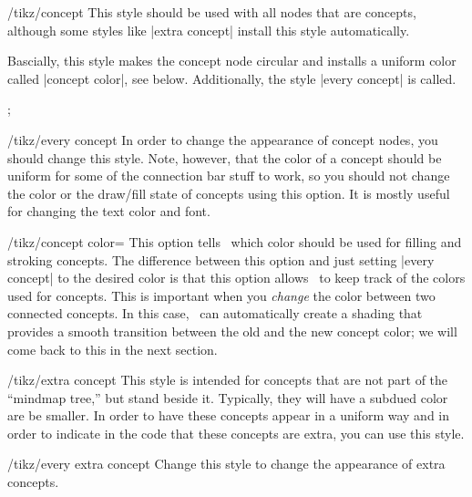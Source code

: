 \begin{stylekey}{/tikz/concept}
  This style should be used with all nodes that are concepts, although
  some styles like |extra concept| install this style automatically.

  Bascially, this style makes the concept node circular and installs a
  uniform color called |concept color|, see below. Additionally, the
  style |every concept| is called.
\begin{codeexample}[]
\tikz[mindmap,concept color=red!50] ;
\end{codeexample}

  \begin{stylekey}{/tikz/every concept}
    In order to change the appearance of concept nodes, you should
    change this style. Note, however, that the color of a concept should
    be uniform for some of the connection bar stuff to work, so you
    should not change the color or the draw/fill state of concepts using
    this option. It is mostly useful for changing the text color and
    font.
  \end{stylekey}

  \begin{key}{/tikz/concept color=}
    This option tells \tikzname\ which color should be used for filling
    and stroking concepts. The difference between this option and just
    setting |every concept| to the desired color is that this option
    allows \tikzname\ to keep track of the colors used for
    concepts. This is important when you \emph{change} the color between
    two connected concepts. In this case, \tikzname\ can automatically
    create a shading that provides a smooth transition between the old
    and the new concept color; we will come back to this in the next
    section.
  \end{key}
\end{stylekey}

\begin{stylekey}{/tikz/extra concept}
  This style is intended for concepts that are not part of the
  ``mindmap tree,'' but stand beside it. Typically, they will have a
  subdued color are be smaller. In order to have these concepts appear
  in a uniform way and in order to indicate in the code that these
  concepts are extra, you can use this style.
\begin{codeexample}[]
\end{codeexample}
  \begin{stylekey}{/tikz/every extra concept}
    Change this style to change the appearance of extra concepts.
  \end{stylekey}
\end{stylekey}



